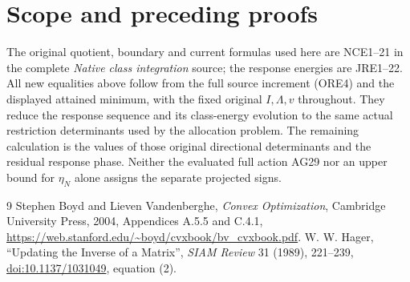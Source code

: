 \documentclass[11pt]{article}
\begin{document}
\section{Scope and preceding proofs}
The original quotient, boundary and current formulas used here are
NCE1--21 in the complete \emph{Native class integration} source;
the response energies are JRE1--22. All new equalities above follow
from the full source increment (ORE4) and the displayed attained
minimum, with the fixed original $I,\Lambda,v$ throughout.
They reduce the response sequence and its class-energy evolution to
the same actual restriction determinants used by the allocation
problem. The remaining calculation is the values of those original
directional determinants and the residual response phase. Neither
the evaluated full action AG29 nor an upper bound for $\eta_N$ alone
assigns the separate projected signs.

\begin{thebibliography}{9}
 Stephen Boyd and Lieven Vandenberghe,
\emph{Convex Optimization}, Cambridge University Press, 2004,
Appendices A.5.5 and C.4.1,
\url{https://web.stanford.edu/~boyd/cvxbook/bv_cvxbook.pdf}.
 W. W. Hager, ``Updating the Inverse of a Matrix'',
\emph{SIAM Review} 31 (1989), 221--239,
\href{https://doi.org/10.1137/1031049}{doi:10.1137/1031049}, equation (2).
\end{thebibliography}
\end{document}
